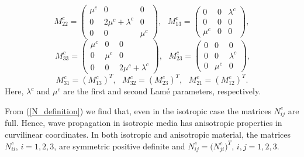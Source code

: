 \begin{equation}\label{M_definition}
M_{22}^c = \left(\begin{array}{ccc}
\mu^c & 0 & 0\\
0 & 2\mu^c+\lambda^c & 0\\
0 & 0 & \mu^c\end{array}\right),\ \ \ M_{13}^c = \left(\begin{array}{ccc}
0 & 0 & \lambda^c\\
0 & 0 & 0\\
\mu^c & 0 & 0\end{array}\right),
\end{equation}
\[\ M_{33}^c = \left(\begin{array}{ccc}
\mu^c & 0 & 0\\
0 & \mu^c & 0\\
0 & 0 & 2\mu^c+\lambda^c\end{array}\right),\ \ \ M_{23}^c = \left(\begin{array}{ccc}
0 & 0 & 0\\
0 & 0 & \lambda^c\\
0 & \mu^c & 0\end{array}\right),\]
\[ M_{31}^c = (M_{13}^c)^T, \ \ \  M_{32}^c =(M_{23}^c)^T, \ \ \ M_{21}^c =(M_{12}^c)^T.\]
Here, $\lambda^c$ and $\mu^c$ are the first and second Lam{\'{e}} parameters, respectively. 

From (\ref{N_definition}) we find that, even in the isotropic case the matrices $N_{ij}^c$ are full. Hence, wave propagation in isotropic media has anisotropic properties in curvilinear coordinates. In both isotropic and anisotropic material, the matrices $N_{ii}^c$, $i = 1,2,3$, are symmetric positive definite and $N_{ij}^c=\big(N_{ji}^c\big)^T$, $i,j=1,2,3$. 

